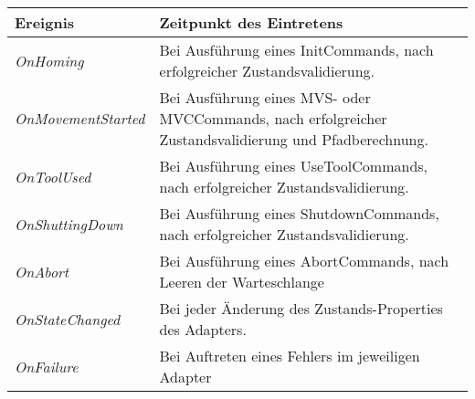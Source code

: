 \begin{tabular}{|p{5cm}|p{9cm}|}
\hline \rowcolor{lightgray}
\textbf{Ereignis} & \textbf{Zeitpunkt des Eintretens}\\
\hline
\textit{OnHoming} & Bei Ausführung eines InitCommands, nach erfolgreicher Zustandsvalidierung.\\
\hline
\textit{OnMovementStarted} & Bei Ausführung eines MVS- oder MVCCommands, nach erfolgreicher Zustandsvalidierung und Pfadberechnung.\\
\hline
\textit{OnToolUsed} & Bei Ausführung eines UseToolCommands, nach erfolgreicher Zustandsvalidierung.\\
\hline
\textit{OnShuttingDown} & Bei Ausführung eines ShutdownCommands, nach erfolgreicher Zustandsvalidierung.\\
\hline
\textit{OnAbort} & Bei Ausführung eines AbortCommands, nach Leeren der Warteschlange\\ 
\hline
\textit{OnStateChanged} & Bei jeder Änderung des Zustands-Properties des Adapters.\\
\hline
\textit{OnFailure} & Bei Auftreten eines Fehlers im jeweiligen Adapter\\
\hline
\end{tabular}

